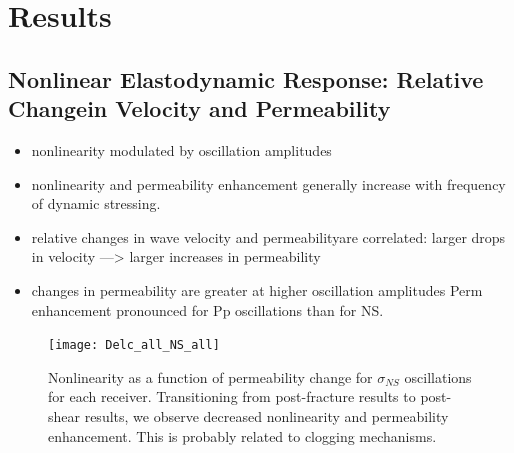 \documentclass[letterpaper,10pt]{article}
\begin{document}
%
%

\section{Results}
\subsection{Nonlinear Elastodynamic Response: Relative Changein Velocity and Permeability}
\begin{itemize}
	\item nonlinearity modulated by oscillation amplitudes
\item nonlinearity and permeability enhancement generally increase with frequency of dynamic stressing.
\item relative changes in wave velocity and permeabilityare correlated: larger drops in velocity —> larger increases in permeability
\item changes in permeability are greater at higher oscillation amplitudes 
\subitem Perm enhancement pronounced for Pp oscillations than for NS.
\end{itemize}

\begin{figure}[ht]
	\centering
	\texttt{[image: Delc\_all\_NS\_all]}
	\caption{Nonlinearity as a function of permeability change for $ \sigma_{NS} $ oscillations for each receiver. Transitioning from post-fracture results to post-shear results, we observe decreased nonlinearity and permeability enhancement. This is probably related to clogging mechanisms.}%
	\label{fig:delc_plots}
\end{figure}
\end{document}
